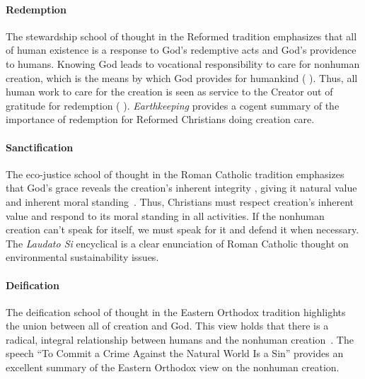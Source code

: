 \documentclass[12pt]{article}
\begin{document}
\paragraph{Redemption} 
\label{sec:redemption}

The stewardship school of thought in the Reformed tradition
emphasizes that all of human existence
is a response to God's redemptive acts
and God's providence to humans.
Knowing God leads to vocational responsibility 
to care for nonhuman creation,
which is the means by which God provides for humankind 
(\textcite{Jenkins:2008} \textcite[19]{Jenkins:2008}). 
Thus, all human work to care for the creation 
is seen as service to the Creator
out of gratitude for redemption (\textcite{Jenkins:2008} \textcite[77]{Jenkins:2008}).
\emph{Earthkeeping} \autocite{Wilkenson:1980aa} provides a cogent summary
of the importance of redemption for Reformed Christians doing creation care.

\paragraph{Sanctification} 
\label{sec:sanctification}

The eco-justice school of thought in the Roman Catholic tradition
emphasizes that God's grace reveals the creation's 
inherent integrity \autocite[19]{Jenkins:2008}, 
giving it natural value and inherent moral standing~\autocite{Joldersma:2019}. 
Thus, Christians must respect creation's inherent value and 
respond to its moral standing in all activities.
If the nonhuman creation can't speak for itself, 
we must speak for it and defend it when necessary.
The \emph{Laudato Si} encyclical \autocite{Pope-Francis:2015aa} 
is a clear enunciation of Roman Catholic thought
on environmental sustainability issues.

\paragraph{Deification} 
\label{sec:deification}

The deification school of thought in the Eastern Orthodox tradition
highlights the union between all of creation and God.
This view holds that there is a radical, integral relationship between humans and 
the nonhuman creation~\autocite[93]{Jenkins:2008}.
The speech ``To Commit a Crime Against the Natural World Is a Sin'' 
\autocite[133-136]{Bartholomew-I-of-Constantinople:2011aa}
provides an excellent summary of the Eastern Orthodox view
on the nonhuman creation.
\end{document}
